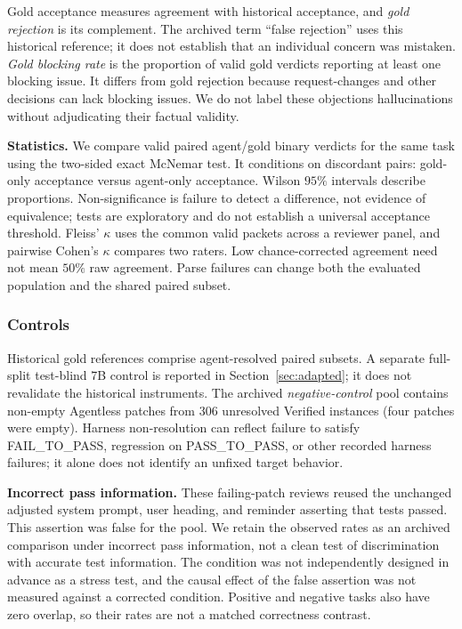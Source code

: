 \documentclass[10pt,conference]{IEEEtran}
\begin{document}
Gold acceptance measures agreement with historical acceptance, and \emph{gold rejection}
is its complement. The archived term ``false rejection'' uses this historical reference;
it does not establish that an individual concern was mistaken. \emph{Gold blocking rate}
is the proportion of valid gold verdicts reporting at least one blocking issue. It differs
from gold rejection because request-changes and other decisions can lack blocking issues.
We do not label these objections hallucinations without adjudicating their factual validity.

\textbf{Statistics.} We compare valid paired agent/gold binary verdicts for the same task
using the two-sided exact McNemar test. It conditions on discordant pairs: gold-only
acceptance versus agent-only acceptance. Wilson $95\%$ intervals describe proportions.
Non-significance is failure to detect a difference, not evidence of equivalence; tests are
exploratory and do not establish a universal acceptance threshold. Fleiss' $\kappa$ uses
the common valid packets across a reviewer panel, and pairwise Cohen's $\kappa$ compares
two raters. Low chance-corrected agreement need not mean $50\%$ raw agreement. Parse
failures can change both the evaluated population and the shared paired subset.

\subsubsection{Controls}

Historical gold references comprise agent-resolved paired subsets. A separate
full-split test-blind 7B control is reported in Section~\ref{sec:adapted}; it does not
revalidate the historical instruments. The archived
\emph{negative-control} pool contains \negN{} non-empty Agentless patches from $306$
unresolved Verified instances (four patches were empty). Harness non-resolution can reflect
failure to satisfy FAIL\_TO\_PASS, regression on PASS\_TO\_PASS, or other recorded harness
failures; it alone does not identify an unfixed target behavior.

\textbf{Incorrect pass information.} These failing-patch reviews reused the unchanged
adjusted system prompt, user heading, and reminder asserting that tests passed. This
assertion was false for the pool. We retain the observed rates as an archived comparison
under incorrect pass information, not a clean test of discrimination with accurate test
information. The condition was not independently designed in advance as a stress test, and
the causal effect of the false assertion was not measured against a corrected condition.
Positive and negative tasks also have zero overlap, so their rates are not a matched
correctness contrast.
\end{document}
